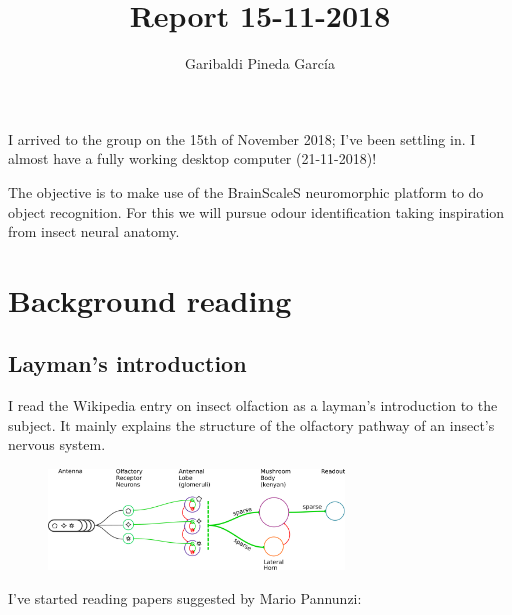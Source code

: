 \documentclass[11pt,a4paper]{article}
\author{Garibaldi Pineda Garc{\'i}a}
\title{Report 15-11-2018}
\begin{document}
  \maketitle
  I arrived to the group on the 15th of November 2018; I've been settling in. 
  I almost have a fully working desktop computer (21-11-2018)!
  
  The objective is to make use of the BrainScaleS neuromorphic platform to do object recognition. 
  For this we will pursue odour identification taking inspiration from insect neural anatomy. 
  
  \section{Background reading}
    \subsection{Layman's introduction}
    I read the Wikipedia entry on insect olfaction as a layman's introduction to the subject. 
    It mainly explains the structure of the olfactory pathway of an insect's nervous system. 
    \begin{figure}[htb]
      \begin{center}
        \includegraphics[width=0.7\textwidth]{olfactory-pathway}
      \end{center}
    \end{figure}
    
    

  I've started reading papers suggested by Mario Pannunzi:
  
\end{document}
